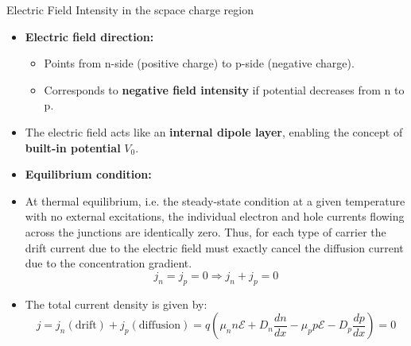 \begin{frame}{Electric Field Intensity in the scpace charge region}
    \begin{itemize}
        \item \textbf{Electric field direction:}
        \begin{itemize}
            \item Points from n-side (positive charge) to p-side (negative charge).
            \item Corresponds to \textbf{negative field intensity} if potential decreases from n to p.
        \end{itemize}
        \item The electric field acts like an \textbf{internal dipole layer}, enabling the concept of \textbf{built-in potential} $V_0$.
		\item \textbf{Equilibrium condition:}
        \item At thermal equilibrium, i.e. the steady-state condition at a given temperature with no external excitations, the
		individual electron and hole currents flowing across the junctions are identically zero. Thus, for each type of
		carrier the drift current due to the electric field must exactly cancel the diffusion current due to the concentration
		gradient.
		\begin{equation}
			j_n = j_p = 0 \Rightarrow j_n + j_p = 0
		\end{equation}
		\item The total current density is given by:
		\begin{equation}
			j = j_n (\text{drift}) + j_p (\text{diffusion}) = q \left( \mu_n n \mathcal{E} + D_n \frac{dn}{dx} - \mu_p p \mathcal{E} - D_p \frac{dp}{dx} \right) = 0
		\end{equation}
    \end{itemize}
\end{frame}

